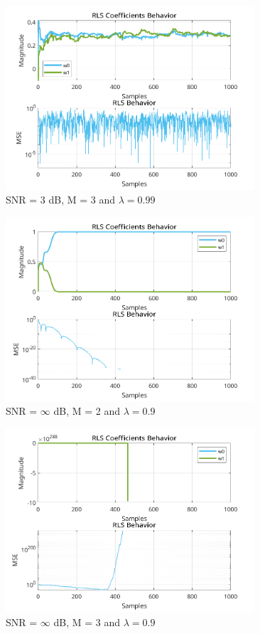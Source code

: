 \documentclass[a4paper,10pt]{article}
\begin{document}
\begin{enumerate}
				\begin{figure}[H]
					\centering
					\includegraphics[width=0.825\textwidth]{figs/L4Q3_rls_mse_3_3_99.png}
					\caption{SNR = 3 dB, M = 3 and $\lambda = 0.99$}
					\label{fig:L4Q3_a4}
				\end{figure}

				\begin{figure}[H]
					\centering
					\includegraphics[width=0.825\textwidth]{figs/L4Q3_rls_mse_2_inf_9.png}
					\caption{SNR = $\infty$ dB, M = 2 and $\lambda = 0.9$}
					\label{fig:L4Q3_a5}
				\end{figure}

				\begin{figure}[H]
					\centering
					\includegraphics[width=0.825\textwidth]{figs/L4Q3_rls_mse_3_inf_9.png}
					\caption{SNR = $\infty$ dB, M = 3 and $\lambda = 0.9$}
					\label{fig:L4Q3_a6}
				\end{figure}


\end{enumerate}
\end{document}
